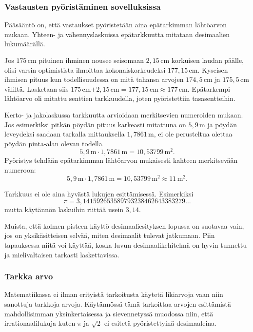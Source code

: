 \subsubsection*{Vastausten pyöristäminen sovelluksissa}

Pääsääntö on, että vastaukset pyöristetään aina epätarkimman lähtöarvon mukaan. Yhteen- ja vähennyslaskuissa epätarkkuutta mitataan desimaalien lukumäärällä.

\begin{esimerkki} Jos $175$\,cm pituinen ihminen nousee seisomaan $2,15$\,cm korkuisen laudan päälle, olisi varsin optimistista ilmoittaa kokonaiskorkeudeksi $177,15$\,cm. Kyseisen ihmisen pituus kun todellisuudessa on mitä tahansa arvojen $174,5$\,cm ja $175,5$\,cm väliltä. Lasketaan siis $175$\,cm$+2,15$\,cm$=177,15$\,cm$\approx 177$\,cm. 
Epätarkempi lähtöarvo oli mitattu senttien tarkkuudella, joten pyöristettiin tasasentteihin.
\end{esimerkki}

Kerto- ja jakolaskussa tarkkuutta arvioidaan merkitsevien numeroiden mukaan. Jos esimerkiksi pitkän pöydän pituus karkeasti mitattuna on $5,9$\,m ja pöydän leveydeksi saadaan tarkalla mittauksella $1,7861$\,m, ei ole perusteltua olettaa pöydän pinta-alan olevan todella
\[ 5,9\,\textrm{m} \cdot 1,7861\,\textrm{m} = 10,53799\,\textrm{m}^2. \] 
Pyöristys tehdään epätarkimman lähtöarvon mukaisesti kahteen merkitsevään numeroon:
\[ 5,9\,\textrm{m} \cdot 1,7861\,\textrm{m} = 10,53799\,\textrm{m}^2 \approx 11\,\textrm{m}^2.\] 

Tarkkuus ei ole aina hyvästä lukujen esittämisessä. Esimerkiksi
\[\pi = 3,141592653589793238462643383279 \ldots \]
mutta käytännön laskuihin riittää usein $3,14$.

Muista, että kolmen pisteen käyttö desimaaliesityksen lopussa on suotavaa vain, jos on yksikäsitteisen selvää, miten desimaalit tulevat jatkumaan. Piin tapauksessa niitä voi käyttää, koska luvun desimaalikehitelmä on hyvin tunnettu ja mielivaltaisen tarkasti laskettavissa.

\subsubsection*{Tarkka arvo}

Matematiikassa ei ilman erityistä tarkoitusta käytetä likiarvoja vaan niin sanottuja tarkkoja arvoja. Käytännössä tämä tarkoittaa arvojen esittämistä mahdollisimman yksinkertaisessa ja sievennetyssä muodossa niin, että irrationaalilukuja kuten $\pi$ ja $\sqrt{2}$ ei esitetä pyöristettyinä desimaaleina. %

